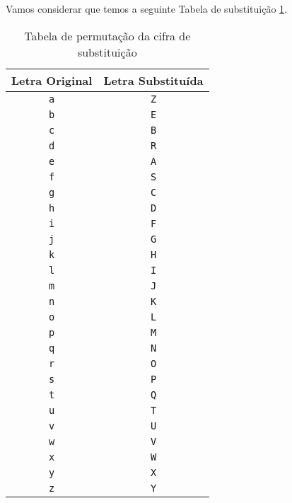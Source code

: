 \begin{example}

Vamos considerar que temos a seguinte Tabela de substituição \ref{table:substitution_cipher}.
  
\begin{table}[h!]
\centering
\begin{tabular}{|c|c|}
\hline
\textbf{Letra Original} & \textbf{Letra Substituída} \\
\hline
\texttt{a} & \texttt{Z} \\
\hline
\texttt{b} & \texttt{E} \\
\hline
\texttt{c} & \texttt{B} \\
\hline
\texttt{d} & \texttt{R} \\
\hline
\texttt{e} & \texttt{A} \\
\hline
\texttt{f} & \texttt{S} \\
\hline
\texttt{g} & \texttt{C} \\
\hline
\texttt{h} & \texttt{D} \\
\hline
\texttt{i} & \texttt{F} \\
\hline
\texttt{j} & \texttt{G} \\
\hline
\texttt{k} & \texttt{H} \\
\hline
\texttt{l} & \texttt{I} \\
\hline
\texttt{m} & \texttt{J} \\
\hline
\texttt{n} & \texttt{K} \\
\hline
\texttt{o} & \texttt{L} \\
\hline
\texttt{p} & \texttt{M} \\
\hline
\texttt{q} & \texttt{N} \\
\hline
\texttt{r} & \texttt{O} \\
\hline
\texttt{s} & \texttt{P} \\
\hline
\texttt{t} & \texttt{Q} \\
\hline
\texttt{u} & \texttt{T} \\
\hline
\texttt{v} & \texttt{U} \\
\hline
\texttt{w} & \texttt{V} \\
\hline
\texttt{x} & \texttt{W} \\
\hline
\texttt{y} & \texttt{X} \\
\hline
\texttt{z} & \texttt{Y} \\
\hline
\end{tabular}
\caption{Tabela de permutação da cifra de substituição}
\label{table:substitution_cipher}
\end{table}


\end{example}
